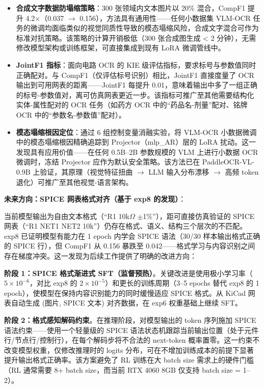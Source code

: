 \begin{itemize}[nosep]
    \item \textbf{合成文字数据防塌缩策略}：300 张领域内文本图片以 20\% 混合，CompF1 提升 4.2$\times$（0.037 $\to$ 0.156），方法具有通用性——任何小数据集 VLM-OCR 任务的微调均面临类似的视觉同质性导致的模态塌缩风险，合成文字混合可作为标准对抗策略。该策略的计算开销极低（300 张合成图生成 < 2 分钟），无需修改模型架构或训练框架，可直接集成到现有 LoRA 微调管线中。
    \item \textbf{JointF1 指标}：面向电路 OCR 的 KIE 级评估指标，要求标号与参数值同时正确配对。与 CompF1（仅评估标号识别）相比，JointF1 直接度量了 OCR 输出到可用网表的距离——JointF1 每提升 0.01，意味着输出中多了一组正确的标号-参数值对，离可仿真网表更近一步。该指标可推广至其他需要结构化实体-属性配对的 OCR 任务（如药方 OCR 中的``药品名-剂量''配对、铭牌 OCR 中的``参数名-参数值''配对）。
    \item \textbf{模态塌缩根因定位}：通过 6 组控制变量消融实验，将 VLM-OCR 小数据微调中的模态塌缩根因精确追踪到 Projector（mlp\_AR）层的 LoRA 扰动。这一发现具有应用价值——在任何 0.5B--2B 参数规模的 VLM 上进行小数据 OCR 微调时，冻结 Projector 应作为默认安全策略。该方法已在 PaddleOCR-VL-0.9B 上验证，其原理（视觉特征扭曲 $\to$ LLM 输入分布漂移 $\to$ 高频 token 退化）可推广至其他视觉-语言架构。
\end{itemize}

\textbf{未来方向：SPICE 网表格式对齐（基于 exp8 的发现）}：

当前模型输出为自由文本格式（``R1  10k$\Omega$  $\pm$1\%''），距可直接仿真验证的 SPICE 网表（``R1 NET1 NET2 10k''）仍存在格式、语义、结构三个层次的不匹配。exp8 已证明模型有能力在 1 epoch 内学会 SPICE 语法（30/30 样本输出格式正确的 SPICE 行），但 CompF1 从 0.156 暴跌至 0.042——格式学习与内容识别之间存在梯度冲突。这一发现为后续工作提供了明确的改进方向：

\textbf{阶段 1：SPICE 格式渐进式 SFT（监督预热）}。关键改进是使用极小学习率（$5\times10^{-6}$，对比 exp8 的 $2\times10^{-5}$）和更长的训练周期（3--5 epochs 替代 exp8 的 1 epoch），使模型在保持内容识别能力的同时缓慢适应 SPICE 格式。从 KiCad 网表自动生成 (图片, SPICE 文本) 对齐数据，在 exp6 权重基础上继续 SFT。

\textbf{阶段 2：格式感知解码约束}。在推理阶段，对模型输出的 token 序列施加 SPICE 语法约束——使用一个轻量级的 SPICE 语法状态机跟踪当前输出位置（处于元件行/节点行/控制行），在每个解码步将不合法的 next-token 概率置零。这一约束不改变模型权重，仅修改推理时的 logits 分布，可在不增加训练成本的前提下显著提升输出格式正确率。该方案避免了 RL 训练在大 batch size 需求上的硬件门槛（RL 通常需要 8+ batch size，而当前 RTX 4060 8GB 仅支持 batch size = 1--2）。


